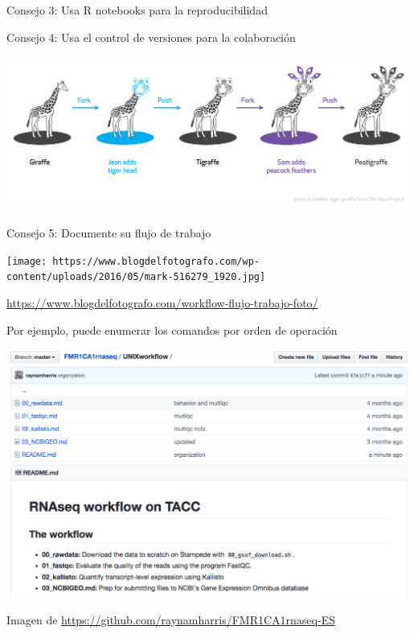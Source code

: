 \begin{frame}{Consejo 3: Usa R notebooks para la reproducibilidad}

\end{frame}

\begin{frame}{Consejo 4: Usa el control de versiones para la
colaboración}

\includegraphics{../figures/talk/git-graphic-01.png}

\end{frame}

\begin{frame}{Consejo 5: Documente su flujo de trabajo}

\texttt{[image: https://www.blogdelfotografo.com/wp-content/uploads/2016/05/mark-516279\_1920.jpg]}

\url{https://www.blogdelfotografo.com/workflow-flujo-trabajo-foto/}

\end{frame}

\begin{frame}{Por ejemplo, puede enumerar los comandos por orden de
operación}

\includegraphics{../figures/talk/unixworkflow.png}

Imagen de \url{https://github.com/raynamharris/FMR1CA1rnaseq-ES}

\end{frame}

